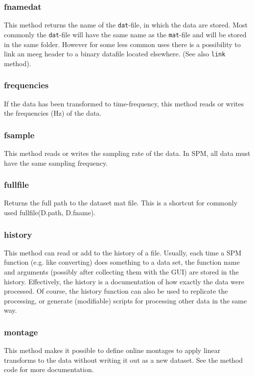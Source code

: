 \subsubsection{fnamedat}
This method returns the name of the \texttt{dat}-file, in which the data are stored. Most commonly the \texttt{dat}-file will have the same name as the \texttt{mat}-file and will be stored in the same folder. However for some less common uses there is a possibility to link an meeg header to a binary datafile located elsewhere. (See also \texttt{link} method).

\subsubsection{frequencies}
If the data has been transformed to time-frequency, this method reads or writes the frequencies (Hz) of the data.

\subsubsection{fsample}
This method reads or writes the sampling rate of the data. In SPM, all data must have the same sampling frequency.

\subsubsection{fullfile}
Returns the full path to the dataset mat file. This is a shortcut for commonly used fullfile(D.path, D.fname).

\subsubsection{history}
This method can read or add to the history of a file. Usually, each time a SPM function (e.g. like converting) does something to a data set, the function name and arguments (possibly after collecting them with the GUI) are stored in the history. Effectively, the history is a documentation of how exactly the data were processed. Of course, the history function can also be used to replicate the processing, or generate (modifiable) scripts for processing other data in the same way.

\subsubsection{montage}
This method makes it possible to define online montages to apply linear transforms to the data without writing it out as a new dataset. See the method code for more documentation. 

